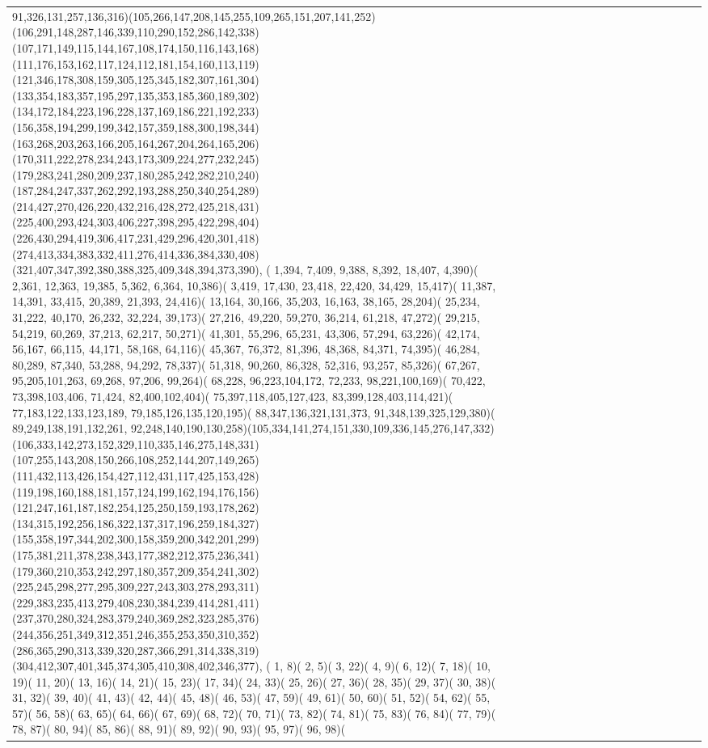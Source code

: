 \documentclass[varwidth=\maxdimen,border=10]{standalone}
\begin{document}
\begin{tabular}{@{}l@{}l@{}l@{}l@{}l@{}l@{}l@{}l@{}l@{}l@{}l@{}l@{}l@{}l@{}l@{}l@{}l@{}l@{}}
91,326,131,257,136,316)(105,266,147,208,145,255,109,265,151,207,141,252)(106,291,148,287,146,339,110,290,152,286,142,338)(107,171,149,115,144,167,108,174,150,116,143,168)(111,176,153,162,117,124,112,181,154,160,113,119)(121,346,178,308,159,305,125,345,182,307,161,304)(133,354,183,357,195,297,135,353,185,360,189,302)(134,172,184,223,196,228,137,169,186,221,192,233)(156,358,194,299,199,342,157,359,188,300,198,344)(163,268,203,263,166,205,164,267,204,264,165,206)(170,311,222,278,234,243,173,309,224,277,232,245)(179,283,241,280,209,237,180,285,242,282,210,240)(187,284,247,337,262,292,193,288,250,340,254,289)(214,427,270,426,220,432,216,428,272,425,218,431)(225,400,293,424,303,406,227,398,295,422,298,404)(226,430,294,419,306,417,231,429,296,420,301,418)(274,413,334,383,332,411,276,414,336,384,330,408)(321,407,347,392,380,388,325,409,348,394,373,390), (  1,394,  7,409,  9,388,  8,392, 18,407,  4,390)(  2,361, 12,363, 19,385,  5,362,  6,364, 10,386)(  3,419, 17,430, 23,418, 22,420, 34,429, 15,417)( 11,387, 14,391, 33,415, 20,389, 21,393, 24,416)( 13,164, 30,166, 35,203, 16,163, 38,165, 28,204)( 25,234, 31,222, 40,170, 26,232, 32,224, 39,173)( 27,216, 49,220, 59,270, 36,214, 61,218, 47,272)( 29,215, 54,219, 60,269, 37,213, 62,217, 50,271)( 41,301, 55,296, 65,231, 43,306, 57,294, 63,226)( 42,174, 56,167, 66,115, 44,171, 58,168, 64,116)( 45,367, 76,372, 81,396, 48,368, 84,371, 74,395)( 46,284, 80,289, 87,340, 53,288, 94,292, 78,337)( 51,318, 90,260, 86,328, 52,316, 93,257, 85,326)( 67,267, 95,205,101,263, 69,268, 97,206, 99,264)( 68,228, 96,223,104,172, 72,233, 98,221,100,169)( 70,422, 73,398,103,406, 71,424, 82,400,102,404)( 75,397,118,405,127,423, 83,399,128,403,114,421)( 77,183,122,133,123,189, 79,185,126,135,120,195)( 88,347,136,321,131,373, 91,348,139,325,129,380)( 89,249,138,191,132,261, 92,248,140,190,130,258)(105,334,141,274,151,330,109,336,145,276,147,332)(106,333,142,273,152,329,110,335,146,275,148,331)(107,255,143,208,150,266,108,252,144,207,149,265)(111,432,113,426,154,427,112,431,117,425,153,428)(119,198,160,188,181,157,124,199,162,194,176,156)(121,247,161,187,182,254,125,250,159,193,178,262)(134,315,192,256,186,322,137,317,196,259,184,327)(155,358,197,344,202,300,158,359,200,342,201,299)(175,381,211,378,238,343,177,382,212,375,236,341)(179,360,210,353,242,297,180,357,209,354,241,302)(225,245,298,277,295,309,227,243,303,278,293,311)(229,383,235,413,279,408,230,384,239,414,281,411)(237,370,280,324,283,379,240,369,282,323,285,376)(244,356,251,349,312,351,246,355,253,350,310,352)(286,365,290,313,339,320,287,366,291,314,338,319)(304,412,307,401,345,374,305,410,308,402,346,377), (  1,  8)(  2,  5)(  3, 22)(  4,  9)(  6, 12)(  7, 18)( 10, 19)( 11, 20)( 13, 16)( 14, 21)( 15, 23)( 17, 34)( 24, 33)( 25, 26)( 27, 36)( 28, 35)( 29, 37)( 30, 38)( 31, 32)( 39, 40)( 41, 43)( 42, 44)( 45, 48)( 46, 53)( 47, 59)( 49, 61)( 50, 60)( 51, 52)( 54, 62)( 55, 57)( 56, 58)( 63, 65)( 64, 66)( 67, 69)( 68, 72)( 70, 71)( 73, 82)( 74, 81)( 75, 83)( 76, 84)( 77, 79)( 78, 87)( 80, 94)( 85, 86)( 88, 91)( 89, 92)( 90, 93)( 95, 97)( 96, 98)( 
\end{tabular}
\end{document}
